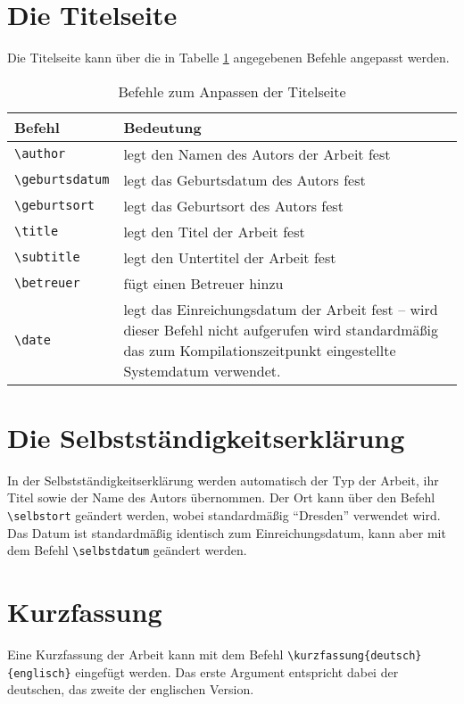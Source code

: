 \section{Die Titelseite}
Die Titelseite kann über die in Tabelle \ref{tab:titel} angegebenen Befehle angepasst werden.
\begin{table}[htbp]
\caption{Befehle zum Anpassen der Titelseite}
\label{tab:titel}
\begin{tabular}{lp{12cm}}
Befehl & Bedeutung\\
\toprule
\verb|\author| & legt den Namen des Autors der Arbeit fest\\
\verb|\geburtsdatum| & legt das Geburtsdatum des Autors fest\\
\verb|\geburtsort| & legt das Geburtsort des Autors fest\\
\verb|\title| & legt den Titel der Arbeit fest\\
\verb|\subtitle| & legt den Untertitel der Arbeit fest\\
\verb|\betreuer| & fügt einen Betreuer hinzu\\
\verb|\date| & legt das Einreichungsdatum der Arbeit fest -- \newline wird dieser Befehl nicht aufgerufen wird standardmäßig das zum Kompilationszeitpunkt eingestellte Systemdatum verwendet.\\
\bottomrule
\end{tabular}
\end{table}
\section{Die Selbstständigkeitserklärung}
In der Selbstständigkeitserklärung werden automatisch der Typ der Arbeit, ihr Titel sowie der Name des Autors übernommen. Der Ort kann über den Befehl \verb|\selbstort| geändert werden, wobei standardmäßig "`Dresden"' verwendet wird. Das Datum ist standardmäßig identisch zum Einreichungsdatum, kann aber mit dem Befehl \verb|\selbstdatum| geändert werden.

\section{Kurzfassung}
Eine Kurzfassung der Arbeit kann mit dem Befehl \verb|\kurzfassung{deutsch}{englisch}| eingefügt werden. Das erste Argument entspricht dabei der deutschen, das zweite der englischen Version.

